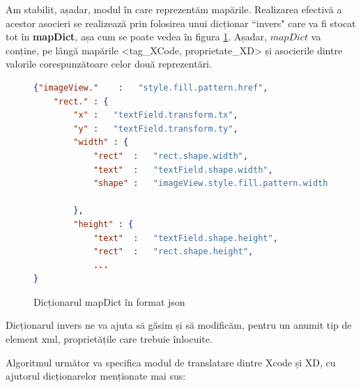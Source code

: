 Am stabilit, așadar, modul în care reprezentăm mapările. Realizarea efectivă a acestor asocieri se realizează prin folosirea unui dicționar ``invers" care va fi stocat tot în \textbf{mapDict}, așa cum se poate vedea în figura \ref{fig:MapDict Schema}. Așadar, $mapDict$ va conține, pe lângă mapările <tag_XCode, proprietate_XD> și asocierile dintre valorile corespunzătoare celor două reprezentări.

\begin{figure}[!htbp]
\begin{lstlisting}[language=json,firstnumber=1]
{"imageView."    :   "style.fill.pattern.href",
    "rect." : {
        "x" :   "textField.transform.tx",
        "y" :   "textField.transform.ty",
        "width" : {
            "rect"  :   "rect.shape.width",
            "text"  :   "textField.shape.width",
            "shape" :   "imageView.style.fill.pattern.width"
        
        },
        "height" : {
            "text"  :   "textField.shape.height",
            "rect"  :   "rect.shape.height",
            ...
}
\end{lstlisting}
\caption{Dicționarul mapDict în format json} \label{fig:MapDict Schema}
\end{figure}

Dicționarul invers ne va ajuta să găsim și să modificăm, pentru un anumit tip de element xml, proprietățile care trebuie înlocuite. 

Algoritmul următor va specifica modul de translatare dintre Xcode și XD, cu ajutorul dicționarelor menționate mai sus:

